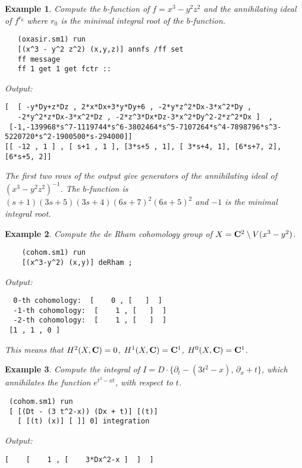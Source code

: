 \documentclass{article}
\newtheorem{example}{Example}
\begin{document}
\begin{example} \rm
Compute the $b$-function of  $f=x^3-y^2 z^2$
and the annihilating ideal of $f^{r_0}$ where
$r_0$ is the minimal integral root of the $b$-function.
\begin{verbatim}
   (oxasir.sm1) run
   [(x^3 - y^2 z^2) (x,y,z)] annfs /ff set
   ff message
   ff 1 get 1 get fctr ::
\end{verbatim}
{\footnotesize
Output:
\begin{verbatim}
[  [ -y*Dy+z*Dz , 2*x*Dx+3*y*Dy+6 , -2*y*z^2*Dx-3*x^2*Dy , 
   -2*y^2*z*Dx-3*x^2*Dz , -2*z^3*Dx*Dz-3*x^2*Dy^2-2*z^2*Dx ]  , 
 [-1,-139968*s^7-1119744*s^6-3802464*s^5-7107264*s^4-7898796*s^3-5220720*s^2-1900500*s-294000]] 
[[ -12 , 1 ] , [ s+1 , 1 ], [3*s+5 , 1], [ 3*s+4, 1], [6*s+7, 2], [6*s+5, 2]] 
\end{verbatim}
}
The first two rows of the output give generators of the annihilating
ideal of
$(x^3-y^2 z^2)^{-1}$.
The $b$-function is
$(s+1)(3s+5)(3s+4)(6s+7)^2(6s+5)^2$
and $-1$ is the minimal integral root.
\end{example}


\begin{example} \rm
Compute the de Rham cohomology group 
of $X={\bf C}^2 \setminus V(x^3-y^2)$.
\begin{verbatim}
    (cohom.sm1) run
    [(x^3-y^2) (x,y)] deRham ;
\end{verbatim}
{\footnotesize
Output:
\begin{verbatim}
  0-th cohomology:  [    0 , [   ]  ] 
  -1-th cohomology:  [    1 , [   ]  ] 
  -2-th cohomology:  [    1 , [   ]  ] 
 [1 , 1 , 0 ]
\end{verbatim}
}
This means that $H^2(X,{\bf C}) = 0$,
$H^1(X,{\bf C}) = {\bf C}^1$,
$H^0(X,{\bf C}) = {\bf C}^1$.
\end{example}

\begin{example} \rm
Compute the integral of
$ I=D\cdot \{\partial_t -(3 t^2-x) ,\,  \partial_x+t \}$,
which annihilates the function $e^{t^3-x t}$,
with respect to $t$.
\begin{verbatim}
 (cohom.sm1) run
 [ [(Dt - (3 t^2-x)) (Dx + t)] [(t)]
   [ [(t) (x)] [ ]] 0] integration
\end{verbatim}
{\footnotesize Output:
\begin{verbatim}
[    [    1 , [    3*Dx^2-x ]  ]  ]
\end{verbatim} }

\end{example}
\end{document}
